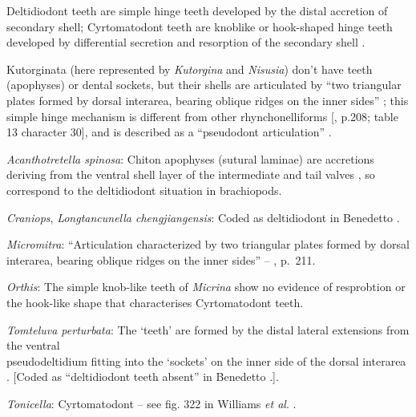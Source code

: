 \documentclass[openany]{book}
\theoremstyle{definition}
\theoremstyle{definition}
\theoremstyle{definition}
\theoremstyle{remark}
\begin{document}
Deltidiodont teeth are simple hinge teeth developed by the distal
accretion of secondary shell; Cyrtomatodont teeth are knoblike or
hook-shaped hinge teeth developed by differential secretion and
resorption of the secondary shell \citep[fig. 322
in][]{Williams1997Introduction}.

Kutorginata (here represented by \emph{Kutorgina} and \emph{Nisusia})
don't have teeth (apophyses) or dental sockets, but their shells are
articulated by ``two triangular plates formed by dorsal interarea,
bearing oblique ridges on the inner sides''
\citep[p.~211]{Williams2000LinguliformeaCraniiformea}; this simple hinge
mechanism is different from other rhynchonelliforms
{[}\citet{Williams2000LinguliformeaCraniiformea}, p.208; table 13
character 30{]}, and is described as a ``pseudodont articulation''
\citep{Holmer2018Evolutionarysignificance}.

\hypertarget{Acanthotretella_spinosa-coding-67}{}
\emph{Acanthotretella spinosa}: Chiton apophyses (sutural laminae) are
accretions deriving from the ventral shell layer of the intermediate and
tail valves \citep{Schwabe2010}, so correspond to the deltidiodont
situation in brachiopods.

\hypertarget{Craniops-coding-67}{}
\emph{Craniops}, \emph{Longtancunella chengjiangensis}: Coded as
deltidiodont in Benedetto \citeyearpar{Benedetto2009iChaniella}.

\hypertarget{Micromitra-coding-67}{}
\emph{Micromitra}: ``Articulation characterized by two triangular plates
formed by dorsal interarea, bearing oblique ridges on the inner sides''
-- \citet{Williams2000LinguliformeaCraniiformea}, p.~211.

\hypertarget{Orthis-coding-67}{}
\emph{Orthis}: The simple knob-like teeth of \emph{Micrina} show no
evidence of resprobtion or the hook-like shape that characterises
Cyrtomatodont teeth.

\hypertarget{Tomteluva_perturbata-coding-67}{}
\emph{Tomteluva perturbata}: The `teeth' are formed by the distal
lateral extensions from the ventral\\
pseudodeltidium fitting into the `sockets' on the inner side of the
dorsal interarea \citep{Holmer2018Evolutionarysignificance}. {[}Coded as
``deltidiodont teeth absent'' in Benedetto
\citeyearpar{Benedetto2009iChaniella}.{]}.

\hypertarget{Tonicella-coding-67}{}
\emph{Tonicella}: Cyrtomatodont -- see fig. 322 in Williams \emph{et
al}. \citeyearpar{Williams2000LinguliformeaCraniiformea}.
\end{document}
